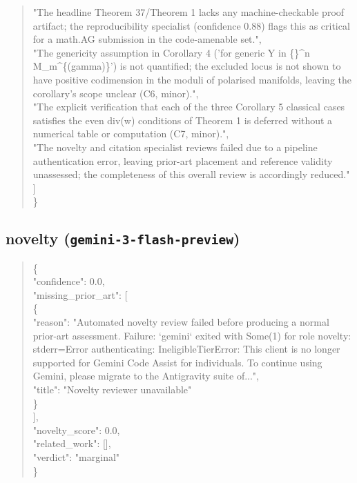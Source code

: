 \documentclass[11pt]{article}
\begin{document}
\begin{quote}
    "The headline Theorem 37/Theorem 1 lacks any machine-checkable proof artifact; the reproducibility specialist (confidence 0.88) flags this as critical for a math.AG submission in the code-amenable set.",\\
    "The genericity assumption in Corollary 4 ('for generic Y in \{\}\^{}n M\_m\^{}\{(gamma)\}') is not quantified; the excluded locus is not shown to have positive codimension in the moduli of polarised manifolds, leaving the corollary's scope unclear (C6, minor).",\\
    "The explicit verification that each of the three Corollary 5 classical cases satisfies the even div(w) conditions of Theorem 1 is deferred without a numerical table or computation (C7, minor).",\\
    "The novelty and citation specialist reviews failed due to a pipeline authentication error, leaving prior-art placement and reference validity unassessed; the completeness of this overall review is accordingly reduced."\\
  ]\\
\}\\
\end{quote}

\subsection*{novelty (\texttt{gemini-3-flash-preview})}
\begin{quote}\small\ttfamily\raggedright
\{\\
  "confidence": 0.0,\\
  "missing\_prior\_art": [\\
    \{\\
      "reason": "Automated novelty review failed before producing a normal prior-art assessment. Failure: `gemini` exited with Some(1) for role novelty: stderr=Error authenticating: IneligibleTierError: This client is no longer supported for Gemini Code Assist for individuals. To continue using Gemini, please migrate to the Antigravity suite of...",\\
      "title": "Novelty reviewer unavailable"\\
    \}\\
  ],\\
  "novelty\_score": 0.0,\\
  "related\_work": [],\\
  "verdict": "marginal"\\
\}\\
\end{quote}
\end{document}

